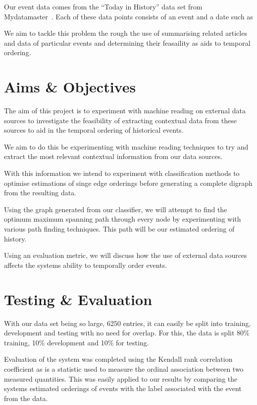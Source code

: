 \documentclass[bsc,frontabs,twoside,singlespacing,parskip,deptreport]{infthesis}     %
\begin{document}
Our event data comes from the ``Today in History'' data set from Mydatamaster~\cite{mydatamaster}. Each of these data points consists
of an event and a date such as
\begin{equation}
  [ \text{``Alaska becomes 49th State''}, \text{``1959-01-01''} ]\nonumber
\end{equation}


We aim to tackle this problem the rough the use of summarising related articles and data of particular
events and determining their feasaility as aids to temporal ordering. 

\section{Aims \& Objectives}
The aim of this project is to experiment with machine reading on external data sources to
investigate the feasibility of extracting contextual data from these sources to aid in the
temporal ordering of historical events.

We aim to do this be experimenting with machine reading techniques to try and extract the most
relevant contextual information from our data sources.

With this information we intend to experiment with classification methods to optimise estimations
of singe edge orderings before generating a complete digraph from the resulting data.

Using the graph generated from our classifier, we will attempt to find the optimum maximum spanning path
through every node by experimenting with various path finding techniques.
This path will be our estimated ordering of history.


Using an evaluation metric, we will discuss how the use of external data sources affects the systems ability to
temporally order events.

\section{Testing \& Evaluation}
With our data set being so large, 6250 entries, it can
easily be split into training, development and testing with no
need for overlap. For this, the data is split 80\% training,
10\% development and 10\% for testing.

Evaluation of the system was completed using the
Kendall rank correlation coefficient as is a statistic
used to measure the ordinal association between two
measured quantities. This was easily applied to our results
by comparing the systems estimated orderings of events
with the label associated with the event from the data.
\end{document}
